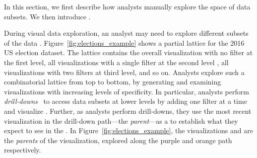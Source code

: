 In this section, we first describe how analysts
manually explore the space of data subsets.
We then introduce .

During visual data exploration,
an analyst may need to explore different subsets
of the data .
Figure~\ref{fig:elections_example}
shows a partial lattice for the 2016 US election dataset.
The lattice contains the overall visualization
with no filter at the first level,
all visualizations with a single filter
at the second level ,
all visualizations with two filters at third level,
and so on.
Analysts explore such a combinatorial lattice
from top to bottom, by generating and examining
visualizations with increasing levels of specificity.
In particular, analysts perform \emph{drill-downs}~\cite{Gray1997}
to access data subsets at lower levels by
adding one filter at a time
and visualize
.
Further, as analysts perform drill-downs,
they use the most recent visualization
in the drill-down path---the {\em parent}---as a 
to establish what they expect to see in the
.
In Figure~\ref{fig:elections_example},
the visualizations \fem and \blk
are the \emph{parents} of the \blkfem visualization,
explored along the purple and orange path respectively.

